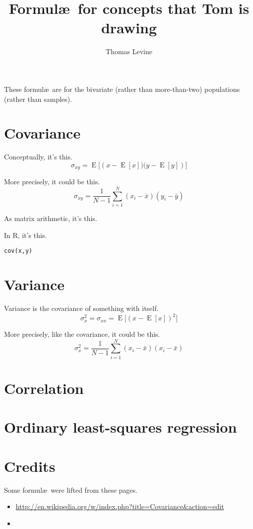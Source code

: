 \documentclass{article}
\title{Formul\ae\ for concepts that Tom is drawing}
\author{Thomas Levine}
\begin{document}
\maketitle

These formul\ae\ are for the bivariate (rather than more-than-two) populations (rather than samples).

\section{Covariance}
Conceptually, it's this.
$$ \sigma_{xy} = \operatorname{E}{\big[\left(x - \operatorname{E}[x])(y - \operatorname{E}[y]\right)\big]} $$

More precisely, it could be this.
$$ \sigma_{xy} = \frac{1}{N-1}\sum_{i=1}^{N}\left( x_{i}-\bar{x} \right) \left( y_{i}-\bar{y} \right) $$

As matrix arithmetic, it's this.

In R, it's this.

\begin{verbatim}
cov(x,y)
\end{verbatim}

\section{Variance}
Variance is the covariance of something with itself.
$$ \sigma_{x}^2 = \sigma_{xx} = \operatorname{E}{\big[\left(x - \operatorname{E}[x]\right)^2\big]} $$

More precisely, like the covariance, it could be this.
$$ \sigma_{x}^2 = \frac{1}{N-1}\sum_{i=1}^{N}\left( x_{i}-\bar{x} \right) \left( x_{i}-\bar{x} \right) $$

\section{Correlation}
\section{Ordinary least-squares regression}

\section{Credits}
Some formul\ae\ were lifted from these pages.
\begin{itemize}
\item \url{http://en.wikipedia.org/w/index.php?title=Covariance&action=edit}
\item \url{}
\end{itemize}
\end{document}
